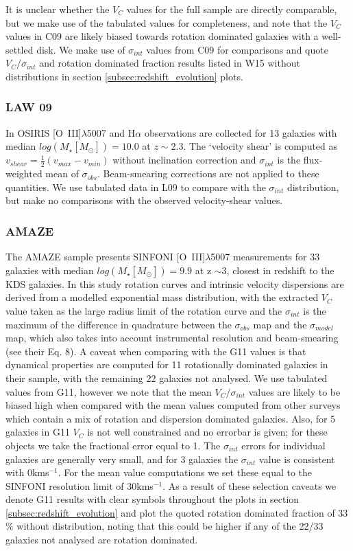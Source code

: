 \documentclass[fleqn,usenatbib]{mn2e}
\begin{document}
It is unclear whether the $V_{C}$ values for the full sample are directly comparable, but we make use of the tabulated values for completeness, and note that the $V_{C}$ values in C09 are likely biased towards rotation dominated galaxies with a well-settled disk.
We make use of $\sigma_{int}$ values from C09 for comparisons and quote $V_{C}/\sigma_{int}$ and rotation dominated fraction results listed in W15 without distributions in section \cref{subsec:redshift_evolution} plots.

\subsubsection{LAW 09}\label{subsubsec:law_09}
In \cite[L09]{Law2009} OSIRIS [O~{\sc III}]$\lambda$5007 and H$\alpha$ observations are collected for 13 galaxies with median $log(M_{\star}[M_{\odot}])=10.0$ at $z\sim2.3$.
The `velocity shear' is computed as $v_{shear} = \frac{1}{2}(v_{max} - v_{min})$ without inclination correction and $\sigma_{int}$ is the flux-weighted mean of $\sigma_{obs}$.
Beam-smearing corrections are not applied to these quantities.
We use tabulated data in L09 to compare with the $\sigma_{int}$ distribution, but make no comparisons with the observed velocity-shear values.

\subsubsection{AMAZE}\label{subsubsec:AMAZE}
The AMAZE sample \cite[G11]{Gnerucci2011} presents SINFONI [O~{\sc III}]$\lambda$5007 measurements for 33 galaxies with median $log(M_{\star}[M_{\odot}])=9.9$ at z $\sim 3$, closest in redshift to the KDS galaxies.
In this study rotation curves and intrinsic velocity dispersions are derived from a modelled exponential mass distribution, with the extracted $V_{C}$ value taken as the large radius limit of the rotation curve and the $\sigma_{int}$ is the maximum of the difference in quadrature between the $\sigma_{obs}$ map and the $\sigma_{model}$ map, which also takes into account instrumental resolution and beam-smearing (see their Eq. 8).
A caveat when comparing with the G11 values is that dynamical properties are computed for 11 rotationally dominated galaxies in their sample, with the remaining 22 galaxies not analysed.
We use tabulated values from G11, however we note that the mean $V_{C}/\sigma_{int}$ values are likely to be biased high when compared with the mean values computed from other surveys which contain a mix of rotation and dispersion dominated galaxies.
Also, for 5 galaxies in G11 $V_{C}$ is not well constrained and no errorbar is given; for these objects we take the fractional error equal to 1.
The $\sigma_{int}$ errors for individual galaxies are generally very small, and for 3 galaxies the $\sigma_{int}$ value is consistent with 0kms$^{-1}$.
For the mean value computations we set these equal to the SINFONI resolution limit of 30kms$^{-1}$.
As a result of these selection caveats we denote G11 results with clear symbols throughout the plots in section \cref{subsec:redshift_evolution} and plot the quoted rotation dominated fraction of 33$\%$ without distribution, noting that this could be higher if any of the 22/33 galaxies not analysed are rotation dominated.
\end{document}
